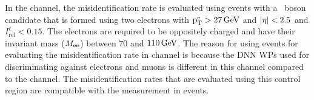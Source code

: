 In the \Hehad channel, the \tauh misidentification rate is evaluated using events with a \PZ\, boson candidate that is formed using two electrons with $\text{p}_\text{T}^{\text{e}} > 27\,\text{Ge\hspace{-.08em}V}$ and $\lvert\eta\rvert < 2.5$ and $I^\ell_{\text{rel}} < 0.15$. The electrons are required to be oppositely charged and have their invariant mass ($M_{\text{e}\text{e}}$) between 70 and $110\,\text{Ge\hspace{-.08em}V}$. The reason for using \Zee events for evaluating the \tauh misidentification rate in \Hehad channel is because the DNN WPs used for discriminating \tauh against electrons and muons is different in this channel compared to the \Hmuhad channel. The misidentification rates that are evaluated using this control region are compatible with the measurement in \Zmm events.

\begin{figure}[htbp]
  \centering
\end{figure}
